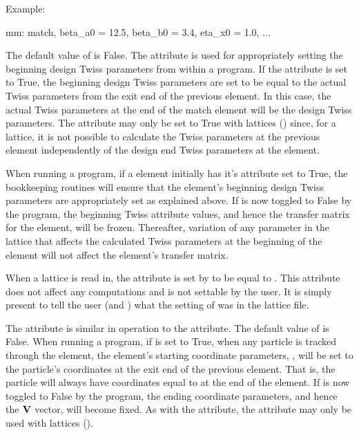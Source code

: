 {Example:
\begin{example}
  mm: match, beta_a0 = 12.5, beta_b0 = 3.4, eta_x0 = 1.0, ...
\end{example}

  \begin{description} 
  \item[match_end, match_end_input] \Newline
The default value of  is False. The  attribute is used for appropriately
setting the beginning design Twiss parameters from within a program. If the  attribute
is set to True, the beginning design Twiss parameters are set to be equal to the actual Twiss
parameters from the exit end of the previous element. In this case, the actual Twiss parameters at
the end of the match element will be the design Twiss parameters. The  attribute may
only be set to True with  lattices () since, for a  lattice, it is
not possible to calculate the Twiss parameters at the previous element independently of the design
end Twiss parameters at the  element.

When running a program, if a  element initially has it's  attribute set to
True, the \bmad bookkeeping routines will ensure that the  element's beginning design
Twiss parameters are appropriately set as explained above. If  is now toggled to False
by the program, the beginning Twiss attribute values, and hence the transfer matrix for the
 element, will be frozen. Thereafter, variation of any parameter in the lattice that
affects the calculated Twiss parameters at the beginning of the  element will not affect the
 element's transfer matrix.

When a lattice is read in, the  attribute is set by \bmad to be equal to
. This attribute does not affect any computations and is not settable by the user. It
is simply present to tell the user (and \bmad) what the setting of  was in the lattice
file.

  \item[match_end_orbit, match_end_orbit_input] \Newline
The  attribute is similar in operation to the  attribute. The
default value of  is False. When running a program, if  is
set to True, when any particle is tracked through the  element, the  element's
starting coordinate parameters, , will be set to the particle's
coordinates at the exit end of the previous element. That is, the particle will always have
coordinates equal to  at the end of the  element.  If
 is now toggled to False by the program, the ending coordinate parameters, and
hence the ${\bf V}$ vector, will become fixed. As with the  attribute, the
 attribute may only be used with  lattices ().


\end{description}}
